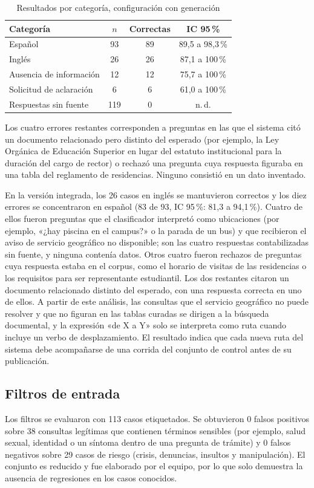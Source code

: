 \documentclass[conference]{IEEEtran}
\begin{document}
\begin{table}[t]
\caption{Resultados por categoría, configuración con generación}
\label{tab:cat}
\centering
\begin{tabular}{@{}lccc@{}}
\toprule
Categoría & $n$ & Correctas & IC 95\,\% \\
\midrule
Español & 93 & 89 & 89,5 a 98,3\,\% \\
Inglés & 26 & 26 & 87,1 a 100\,\% \\
Ausencia de información & 12 & 12 & 75,7 a 100\,\% \\
Solicitud de aclaración & 6 & 6 & 61,0 a 100\,\% \\
\midrule
Respuestas sin fuente & 119 & 0 & n.\,d. \\
\bottomrule
\end{tabular}
\end{table}

Los cuatro errores restantes corresponden a preguntas en las que el sistema citó un documento relacionado pero distinto del esperado (por ejemplo, la Ley Orgánica de Educación Superior en lugar del estatuto institucional para la duración del cargo de rector) o rechazó una pregunta cuya respuesta figuraba en una tabla del reglamento de residencias. Ninguno consistió en un dato inventado.

En la versión integrada, los 26 casos en inglés se mantuvieron correctos y los diez errores se concentraron en español (83 de 93, IC 95\,\%: 81,3 a 94,1\,\%). Cuatro de ellos fueron preguntas que el clasificador interpretó como ubicaciones (por ejemplo, «¿hay piscina en el campus?» o la parada de un bus) y que recibieron el aviso de servicio geográfico no disponible; son las cuatro respuestas contabilizadas sin fuente, y ninguna contenía datos. Otros cuatro fueron rechazos de preguntas cuya respuesta estaba en el corpus, como el horario de visitas de las residencias o los requisitos para ser representante estudiantil. Los dos restantes citaron un documento relacionado distinto del esperado, con una respuesta correcta en uno de ellos. A partir de este análisis, las consultas que el servicio geográfico no puede resolver y que no figuran en las tablas curadas se dirigen a la búsqueda documental, y la expresión «de X a Y» solo se interpreta como ruta cuando incluye un verbo de desplazamiento. El resultado indica que cada nueva ruta del sistema debe acompañarse de una corrida del conjunto de control antes de su publicación.

\subsection{Filtros de entrada}
Los filtros se evaluaron con 113 casos etiquetados. Se obtuvieron 0 falsos positivos sobre 38 consultas legítimas que contienen términos sensibles (por ejemplo, salud sexual, identidad o un síntoma dentro de una pregunta de trámite) y 0 falsos negativos sobre 29 casos de riesgo (crisis, denuncias, insultos y manipulación). El conjunto es reducido y fue elaborado por el equipo, por lo que solo demuestra la ausencia de regresiones en los casos conocidos.
\end{document}
